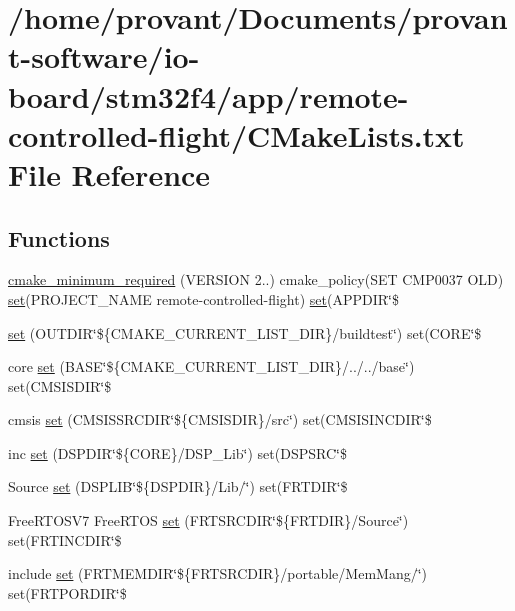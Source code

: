 \hypertarget{CMakeLists_8txt}{}\section{/home/provant/\+Documents/provant-\/software/io-\/board/stm32f4/app/remote-\/controlled-\/flight/\+C\+Make\+Lists.txt File Reference}
\label{CMakeLists_8txt}
\subsection*{Functions}
\begin{DoxyCompactItemize}
\item 
\hyperlink{CMakeLists_8txt_aef80c282ddc0836d69df376060234fce}{cmake\+\_\+minimum\+\_\+required} (V\+E\+R\+S\+I\+ON 2..) cmake\+\_\+policy(S\+ET C\+M\+P0037 O\+LD) \hyperlink{CMakeLists_8txt_a6ff7757e73646eb491e3cd678902beed}{set}(P\+R\+O\+J\+E\+C\+T\+\_\+\+N\+A\+ME remote-\/controlled-\/flight) \hyperlink{CMakeLists_8txt_a6ff7757e73646eb491e3cd678902beed}{set}(A\+P\+P\+D\+IR\char`\"{}\$
\item 
\hyperlink{CMakeLists_8txt_a8ccd63c3a8ce266e619619ed30262689}{set} (O\+U\+T\+D\+IR\char`\"{}\$\{C\+M\+A\+K\+E\+\_\+\+C\+U\+R\+R\+E\+N\+T\+\_\+\+L\+I\+S\+T\+\_\+\+D\+IR\}/buildtest\char`\"{}) set(C\+O\+RE\char`\"{}\$
\item 
core \hyperlink{CMakeLists_8txt_adad964fe5734f8fa97709cda2d1d1203}{set} (B\+A\+SE\char`\"{}\$\{C\+M\+A\+K\+E\+\_\+\+C\+U\+R\+R\+E\+N\+T\+\_\+\+L\+I\+S\+T\+\_\+\+D\+IR\}/../../base\char`\"{}) set(C\+M\+S\+I\+S\+D\+IR\char`\"{}\$
\item 
cmsis \hyperlink{CMakeLists_8txt_aa1cb6cbed720134dafc50fe60197c62c}{set} (C\+M\+S\+I\+S\+S\+R\+C\+D\+IR\char`\"{}\$\{C\+M\+S\+I\+S\+D\+IR\}/src\char`\"{}) set(C\+M\+S\+I\+S\+I\+N\+C\+D\+IR\char`\"{}\$
\item 
inc \hyperlink{CMakeLists_8txt_a5eefef341371ecbbd5acbb9106123ddd}{set} (D\+S\+P\+D\+IR\char`\"{}\$\{C\+O\+RE\}/D\+S\+P\+\_\+\+Lib\char`\"{}) set(D\+S\+P\+S\+RC\char`\"{}\$
\item 
Source \hyperlink{CMakeLists_8txt_aad905f700e203964e09916a72c7db0d0}{set} (D\+S\+P\+L\+IB\char`\"{}\$\{D\+S\+P\+D\+IR\}/Lib/\char`\"{}) set(F\+R\+T\+D\+IR\char`\"{}\$
\item 
Free\+R\+T\+O\+S\+V7 Free\+R\+T\+OS \hyperlink{CMakeLists_8txt_acfd28e84a5e2c6910adf4fa1aee99b25}{set} (F\+R\+T\+S\+R\+C\+D\+IR\char`\"{}\$\{F\+R\+T\+D\+IR\}/Source\char`\"{}) set(F\+R\+T\+I\+N\+C\+D\+IR\char`\"{}\$
\item 
include \hyperlink{CMakeLists_8txt_a6ff7757e73646eb491e3cd678902beed}{set} (F\+R\+T\+M\+E\+M\+D\+IR\char`\"{}\$\{F\+R\+T\+S\+R\+C\+D\+IR\}/portable/Mem\+Mang/\char`\"{}) set(F\+R\+T\+P\+O\+R\+D\+IR\char`\"{}\$
\end{DoxyCompactItemize}


